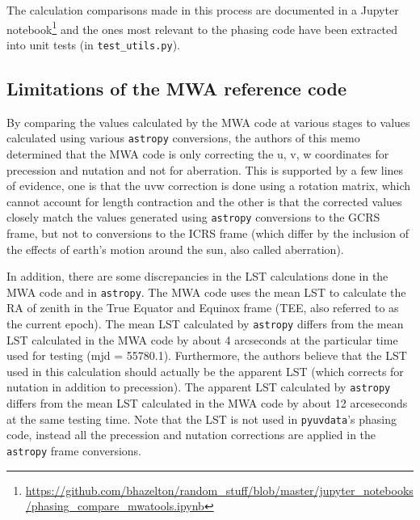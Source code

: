 \documentclass[11pt, oneside]{article}   	%
\begin{document}
The calculation comparisons made in this process are documented in a Jupyter notebook\footnote{\url{https://github.com/bhazelton/random_stuff/blob/master/jupyter_notebooks/phasing_compare_mwatools.ipynb}} and the ones most relevant to the phasing code have been extracted into unit tests (in \verb!test_utils.py!).

\subsection{Limitations of the MWA reference code}
By comparing the values calculated by the MWA code at various stages to values calculated using various \texttt{astropy} conversions, the authors of this memo determined that the MWA code is only correcting the u, v, w coordinates for precession and nutation and not for aberration. This is supported by a few lines of evidence, one is that the uvw correction is done using a rotation matrix, which cannot account for length contraction and the other is that the corrected values closely match the values generated using \texttt{astropy} conversions to the GCRS frame, but not to conversions to the ICRS frame (which differ by the inclusion of the effects of earth's motion around the sun, also called aberration).

In addition, there are some discrepancies in the LST calculations done in the MWA code and in \texttt{astropy}. The MWA code uses the mean LST to calculate the RA of zenith in the True Equator and Equinox frame (TEE, also referred to as the current epoch). The mean LST calculated by \texttt{astropy} differs from the mean LST calculated in the MWA code by about 4 arcseconds at the particular time used for testing (mjd = 55780.1). Furthermore, the authors believe that the LST used in this calculation should actually be the apparent LST (which corrects for nutation in addition to precession). The apparent LST calculated by \texttt{astropy} differs from the mean LST calculated in the MWA code by about 12 arceseconds at the same testing time. Note that the LST is not used in \texttt{pyuvdata}'s phasing code, instead all the precession and nutation corrections are applied in the \texttt{astropy} frame conversions.
\end{document}
